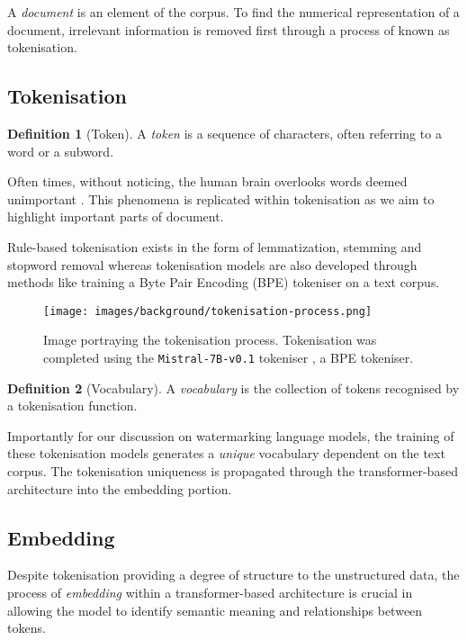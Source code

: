 \documentclass{l4proj}
\theoremstyle{definition}
\newtheorem{definition}{Definition}[section]
\begin{document}
    A \emph{document} is an element of the corpus. %
    To find the numerical representation of a document, irrelevant information is removed first through a process of known as tokenisation.
    \subsection{Tokenisation}
        \begin{definition}[Token]
            A \emph{token} is a sequence of characters, often referring to a word or a subword.
        \end{definition}

        Often times, without noticing, the human brain overlooks words deemed unimportant \citep{Rayner2011-pk}. This phenomena is replicated within tokenisation as we aim to highlight important parts of document.

        Rule-based tokenisation exists in the form of lemmatization, stemming and stopword removal whereas tokenisation models are also developed through methods like training a Byte Pair Encoding (BPE) tokeniser \citep{Gage1994ANA, sennrich2016neural} on a text corpus.

        \begin{figure}[h]
            \centering
            \texttt{[image: images/background/tokenisation-process.png]}
                \caption{Image portraying the tokenisation process. Tokenisation was completed using the \texttt{Mistral-7B-v0.1} tokeniser \citep{jiang2023mistral}, a BPE tokeniser.}
            \label{fig:tokenisation-process} 
        \end{figure}

        \begin{definition}[Vocabulary]
            A \emph{vocabulary} is the collection of tokens recognised by a tokenisation function.
        \end{definition}

        Importantly for our discussion on watermarking language models, the training of these tokenisation models generates a \emph{unique} vocabulary dependent on the text corpus. The tokenisation uniqueness is propagated through the transformer-based architecture into the embedding portion.

    \subsection{Embedding}
        Despite tokenisation providing a degree of structure to the unstructured data, the process of \emph{embedding} within a transformer-based architecture is crucial in allowing the model to identify semantic meaning and relationships between tokens. 
\end{document}
